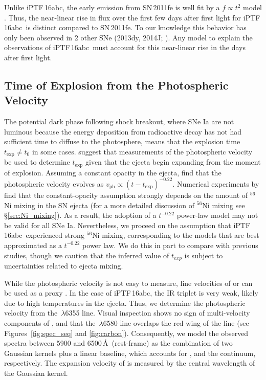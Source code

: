 \documentclass[twocolumn]{aastex61}
\newcommand{\abc}{iPTF\,16abc}
\begin{document}
Unlike \abc, the early emission from SN\,2011fe is well fit by a $f \propto
t^2$ model \citep{2011Natur.480..344N}. Thus, the near-linear rise in flux
over the first few days after first light for \abc\ is distinct compared to
SN\,2011fe. To our knowledge this behavior has only been observed in 2 other
SNe (2013dy, 2014J;
\citealt{2013ApJ...778L..15Z,2014ApJ...783L..24Z,2015ApJ...799..106G}). Any
model to explain the observations of \abc\ must account for this near-linear
rise in the days after first light.

\subsection{Time of Explosion from the Photospheric Velocity}
\label{sec:early_vel}

The potential dark phase following shock breakout, where SNe Ia are not luminous because the energy deposition from radioactive decay has not had sufficient time to diffuse to the photosphere, means that the explosion time $t_\mathrm{exp} \ne t_0$ in some cases. \citet{2014ApJ...784...85P} suggest that measurements of the photospheric velocity be used to determine $t_\mathrm{exp}$ given that the ejecta begin expanding from the moment of explosion.  Assuming a constant opacity in the ejecta, \citeauthor{2014ApJ...784...85P} 
find that the photospheric velocity evolves as
$v_\mathrm{ph}\propto(t-t_\mathrm{exp})^{-0.22}$. Numerical experiments by \citet{2016ApJ...826...96P} find that the constant-opacity assumption strongly depends on the amount of $^{56}$Ni mixing in the SN ejecta (for a more detailed discussion of $^{56}$Ni mixing see \S\ref{sec:Ni_mixing}). As a result, the adoption of a $t^{-0.22}$ power-law model may not be valid for all SNe Ia. Nevertheless, we proceed on the assumption that \abc\ experienced strong $^{56}$Ni mixing, corresponding to the models that are best approximated as a $t^{-0.22}$ power law. We do this in part to compare with previous studies, though we caution that the inferred value of $t_{exp}$ is subject to uncertainties related to ejecta mixing. 

While the photospheric velocity
is not easy to measure, line velocities of  or 
can be used as a proxy
\citep{2014ApJ...784...85P,2016ApJ...826..144S}. In the case of \abc, the  IR triplet is very weak, 
likely due to high temperatures in the ejecta. Thus, we
determine the photospheric velocity from the 
\,$\lambda$6355 line. Visual inspection shows no 
sign of multi-velocity components of , and that 
the \,$\lambda$6580 line overlaps the red
wing of the  line (see Figures~\ref{fig:spec_seq} and \ref{fig:carbon}). Consequently, we model the observed 
spectra between 5900 and 6500\,\AA\ (rest-frame) as the 
combination of two Gaussian kernels plus a linear baseline, which
accounts for ,  and the
continuum, respectively. The expansion
velocity of  is measured by the central wavelength
of the  Gaussian kernel.
\end{document}
